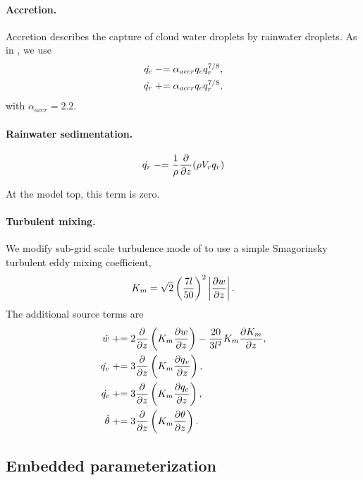 \paragraph{Accretion.} Accretion describes the capture of cloud water droplets by rainwater droplets.
As in \cite{SoongOgura1973,KlempWilhelmson1978}, we use
\begin{subequations}\label{eq:accretion}
\begin{align}
  \dot{q_c} &\mathrel{-}= \alpha_{accr}q_cq_r^{7/8}, \\
  \dot{q_r} &\mathrel{+}= \alpha_{accr} q_c q_r^{7/8},
\end{align}
\end{subequations}
with $\alpha_{accr} = 2.2$.

\paragraph{Rainwater sedimentation.} 

\begin{equation}
  \dot{q_r} \mathrel{-}= \frac{1}{\rho}\frac{\partial  }{\partial z}(\rho V_rq_r)
\end{equation}

At the model top, this term is zero.


\paragraph{Turbulent mixing.}

We modify sub-grid scale turbulence mode of \cite{KlempWilhelmson1978} to use a simple Smagorinsky turbulent eddy mixing coefficient,
\begin{equation}
  K_m = \sqrt{2}\left(\frac{7l}{50}\right)^2 \left\lvert\frac{\partial w }{\partial z}\right\rvert.
\end{equation}
The additional source terms are \cite[eqns.~(3.15)--(3.16)]{KlempWilhelmson1978}
\begin{align}
  \dot{w} &\mathrel{+}= 2 \frac{\partial  }{\partial z}\left(K_m \frac{\partial w }{\partial z}\right) - \frac{20}{3 l^2}K_m\frac{\partial K_m }{\partial z},\\
  \dot{q_v} &\mathrel{+}= 3\frac{\partial  }{\partial z}\left(K_m\frac{\partial q_v }{\partial z}\right), \\
  \dot{q_c} &\mathrel{+}= 3\frac{\partial  }{\partial z}\left(K_m\frac{\partial q_c }{\partial z}\right), \\
  \dot{\theta} &\mathrel{+}= 3\frac{\partial  }{\partial z}\left(K_m\frac{\partial \theta }{\partial z}\right). 
\end{align}
\subsection{Embedded parameterization}
